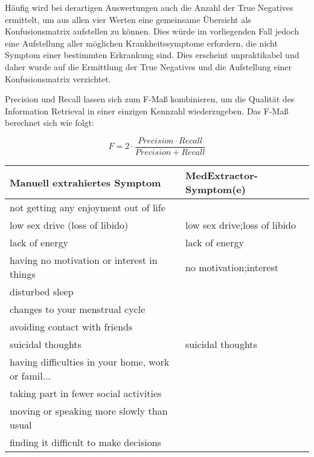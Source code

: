 Häufig wird bei derartigen Auswertungen auch die Anzahl der True Negatives ermittelt, um aus allen vier Werten eine gemeinsame Übersicht als Konfusionsmatrix aufstellen zu können. Dies würde im vorliegenden Fall jedoch eine Aufstellung aller möglichen Krankheitssymptome erfordern, die nicht Symptom einer bestimmten Erkrankung sind. Dies erscheint unpraktikabel und daher wurde auf die Ermittlung der True Negatives und die Aufstellung einer Konfusionsmatrix verzichtet.

Precision und Recall lassen sich zum F-Maß kombinieren, um die Qualität des Information Retrieval in einer einzigen Kennzahl wiederzugeben. Das F-Maß berechnet sich wie folgt:

\[ F =  2\cdot\frac{Precision\cdot Recall }{Precision + Recall} \]

\begin{table}
\begin{center}
\begin{tabular}{ll}
\toprule
                      Manuell extrahiertes Symptom &       MedExtractor-Symptom(e) \\
\midrule
             not getting any enjoyment out of life &                               \\
                    low sex drive (loss of libido) &  low sex drive;loss of libido \\
                                    lack of energy &                lack of energy \\
        having no motivation or interest in things &        no motivation;interest \\
                                   disturbed sleep &                               \\
                   changes to your menstrual cycle &                               \\
                     avoiding contact with friends &                               \\
                                 suicidal thoughts &             suicidal thoughts \\
having difficulties in your home, work or famil... &                               \\
            taking part in fewer social activities &                               \\
         moving or speaking more slowly than usual &                               \\
            finding it difficult to make decisions &                               \\

\end{tabular}
\end{center}
\end{table}
